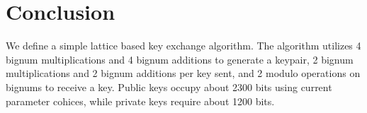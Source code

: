 \documentclass[preprint]{iacrtrans}
\begin{document}
\section{Conclusion}
 We define a simple lattice based key exchange algorithm. The algorithm utilizes 4 bignum multiplications and 4 bignum additions to generate a keypair, 2 bignum multiplications and 2 bignum additions per key sent, and 2 modulo operations on bignums to receive a key. Public keys occupy about 2300 bits using current parameter cohices, while private keys require about 1200 bits.
\end{document}
